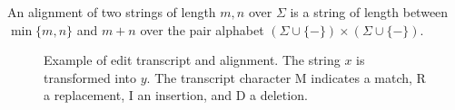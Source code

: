 \begin{definition}
\label{def:alignment}
An alignment of two strings of length $m,n$ over $\Sigma$ is a string of length between $\min\{m,n\}$ and $m+n$ over the pair alphabet $(\Sigma \cup \{ - \}) \times (\Sigma \cup \{ - \})$.
\end{definition}

\begin{figure}[h]
\begin{center}
\caption[Example of edit transcript and alignment]{Example of edit transcript and alignment. The string $x$ is transformed into $y$. The transcript character M indicates a match, R a replacement, I an insertion, and D a deletion.
}
\label{fig:edit-transcript}

\end{center}
\end{figure}

%
%


